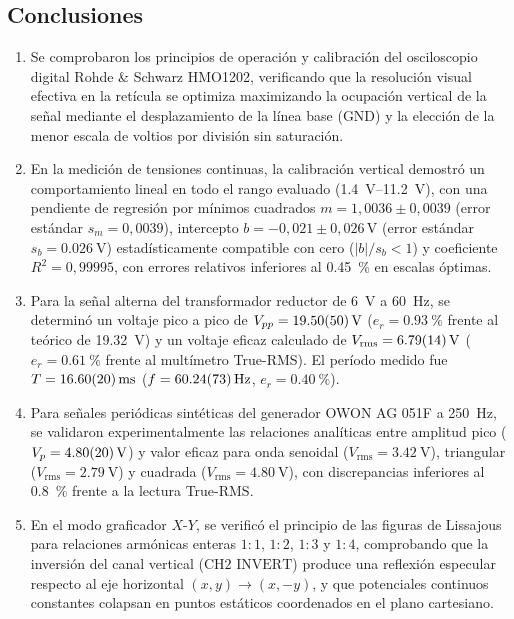 \subsection{Conclusiones}
\begin{enumerate}
    \item Se comprobaron los principios de operación y calibración del osciloscopio digital Rohde \& Schwarz HMO1202, verificando que la resolución visual efectiva en la retícula se optimiza maximizando la ocupación vertical de la señal mediante el desplazamiento de la línea base ($\text{GND}$) y la elección de la menor escala de voltios por división sin saturación.

    \item En la medición de tensiones continuas, la calibración vertical demostró un comportamiento lineal en todo el rango evaluado (\qtyrange{1,4}{11,2}{\volt}), con una pendiente de regresión por mínimos cuadrados $m = 1{,}0036 \pm 0{,}0039$ (error estándar $s_m = 0{,}0039$), intercepto $b = -0{,}021 \pm 0{,}026\,\unit{\volt}$ (error estándar $s_b = \qty{0,026}{\volt}$) estadísticamente compatible con cero ($|b|/s_b < 1$) y coeficiente $R^2 = 0{,}99995$, con errores relativos inferiores al \qty{0,45}{\percent} en escalas óptimas.

    \item Para la señal alterna del transformador reductor de \qty{6}{\volt} a \qty{60}{\hertz}, se determinó un voltaje pico a pico de $V_{pp} = \qty{19,50 \pm 0,50}{\volt}$ ($e_r = \qty{0,93}{\percent}$ frente al teórico de \qty{19,32}{\volt}) y un voltaje eficaz calculado de $V_{\text{rms}} = \qty{6,79 \pm 0,14}{\volt}$ ($e_r = \qty{0,61}{\percent}$ frente al multímetro True-RMS). El período medido fue $T = \qty{16,60 \pm 0,20}{\milli\second}$ ($f = \qty{60,24 \pm 0,73}{\hertz}$, $e_r = \qty{0,40}{\percent}$).

    \item Para señales periódicas sintéticas del generador OWON AG 051F a \qty{250}{\hertz}, se validaron experimentalmente las relaciones analíticas entre amplitud pico ($V_p = \qty{4,80 \pm 0,20}{\volt}$) y valor eficaz para onda senoidal ($V_{\text{rms}} = \qty{3,42}{\volt}$), triangular ($V_{\text{rms}} = \qty{2,79}{\volt}$) y cuadrada ($V_{\text{rms}} = \qty{4,80}{\volt}$), con discrepancias inferiores al \qty{0,8}{\percent} frente a la lectura True-RMS.

    \item En el modo graficador $X$-$Y$, se verificó el principio de las figuras de Lissajous para relaciones armónicas enteras $1:1$, $1:2$, $1:3$ y $1:4$, comprobando que la inversión del canal vertical ($\text{CH2 INVERT}$) produce una reflexión especular respecto al eje horizontal $(x, y) \to (x, -y)$, y que potenciales continuos constantes colapsan en puntos estáticos coordenados en el plano cartesiano.
\end{enumerate}
